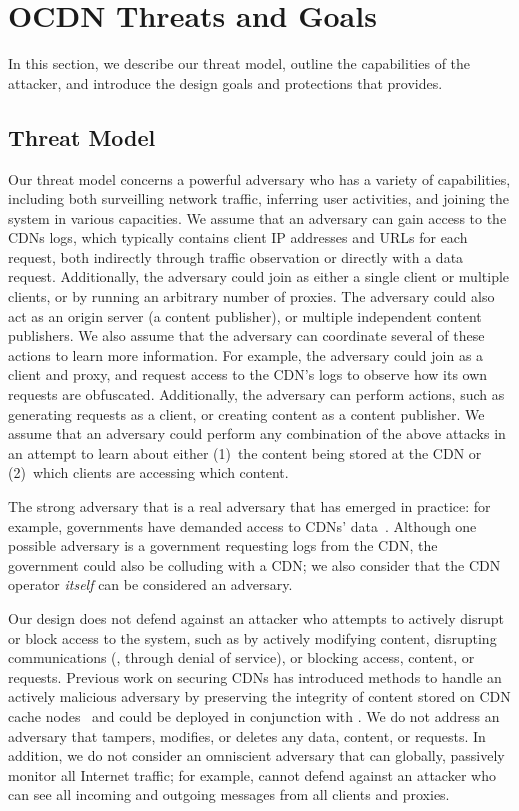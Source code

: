 \section{OCDN Threats and Goals}
\label{sec:threat}
In this section, we describe our threat model, outline the capabilities of the 
attacker, and introduce the design goals and protections that \system{} provides.

\subsection{Threat Model}
\label{sec:attacker}

Our threat model concerns a powerful adversary who has a variety of capabilities,
including both surveilling network traffic, inferring user activities, and joining
the system in various capacities.
We assume that an adversary can gain
access to the CDNs logs, which typically contains client IP addresses and URLs for
each request, both indirectly through traffic observation or directly with a data
request. Additionally,
the adversary could join \system{} as either a single client or multiple clients,
or by running an arbitrary number of \system{} proxies.  The adversary could 
also act as an origin server (a content publisher), or multiple independent content
publishers. We also assume that the adversary
can coordinate several of these actions to learn more information.  For example, the 
adversary could join as a client and proxy, and request access to the CDN's
logs to observe how its own requests are obfuscated.  Additionally, 
the adversary can perform actions, such as generating requests as a client, or creating content 
as a content publisher. We assume that an adversary could perform any combination
of the above attacks in an attempt to learn about either (1)~the content being stored
at the CDN or (2)~which clients are accessing which content.  

The strong adversary that is a real adversary that has emerged in practice:
for example, governments have demanded access to CDNs'
data~\cite{cloudflare_nsl}.  Although one possible adversary is a government
requesting logs from the CDN,  the government could also be colluding with a
CDN; we also consider that the CDN operator \textit{itself} can be considered an adversary.

Our design does not defend against an attacker who attempts to actively
disrupt or block access to the system, such as by actively modifying content,
disrupting communications (\eg, through denial of service), or blocking
access, content, or requests. Previous work on securing CDNs has introduced
methods to handle an actively malicious adversary by preserving the integrity
of content  stored on CDN cache nodes~\cite{levy2015stickler} and could be
deployed in conjunction with \system{}. We do not address an adversary that
tampers, modifies, or deletes any data, content, or requests.  In addition, we
do not consider an omniscient adversary that can globally, passively monitor
all Internet traffic; for example, \system{} cannot defend against an attacker
who can see all incoming and outgoing messages from all clients and proxies.

